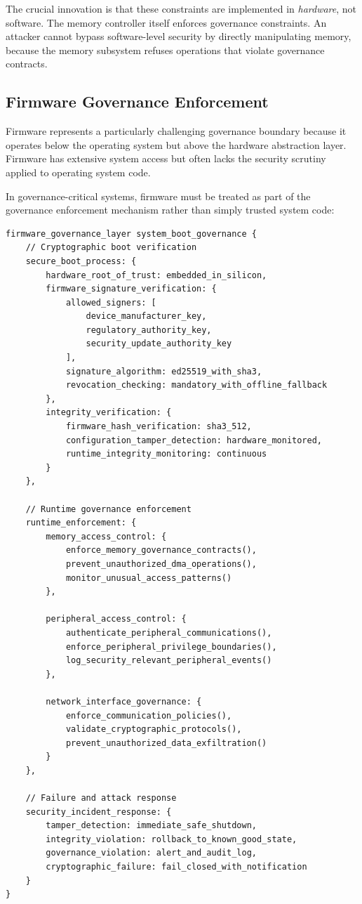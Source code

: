 The crucial innovation is that these constraints are implemented in \textit{hardware}, not software. The memory controller itself enforces governance constraints. An attacker cannot bypass software-level security by directly manipulating memory, because the memory subsystem refuses operations that violate governance contracts.

\subsection{Firmware Governance Enforcement}

Firmware represents a particularly challenging governance boundary because it operates below the operating system but above the hardware abstraction layer. Firmware has extensive system access but often lacks the security scrutiny applied to operating system code.

In governance-critical systems, firmware must be treated as part of the governance enforcement mechanism rather than simply trusted system code:

\begin{lstlisting}[language=rift, caption=Governance-Enforcing Firmware Architecture]
firmware_governance_layer system_boot_governance {
    // Cryptographic boot verification
    secure_boot_process: {
        hardware_root_of_trust: embedded_in_silicon,
        firmware_signature_verification: {
            allowed_signers: [
                device_manufacturer_key,
                regulatory_authority_key,
                security_update_authority_key
            ],
            signature_algorithm: ed25519_with_sha3,
            revocation_checking: mandatory_with_offline_fallback
        },
        integrity_verification: {
            firmware_hash_verification: sha3_512,
            configuration_tamper_detection: hardware_monitored,
            runtime_integrity_monitoring: continuous
        }
    },
    
    // Runtime governance enforcement
    runtime_enforcement: {
        memory_access_control: {
            enforce_memory_governance_contracts(),
            prevent_unauthorized_dma_operations(),
            monitor_unusual_access_patterns()
        },
        
        peripheral_access_control: {
            authenticate_peripheral_communications(),
            enforce_peripheral_privilege_boundaries(),
            log_security_relevant_peripheral_events()
        },
        
        network_interface_governance: {
            enforce_communication_policies(),
            validate_cryptographic_protocols(),
            prevent_unauthorized_data_exfiltration()
        }
    },
    
    // Failure and attack response
    security_incident_response: {
        tamper_detection: immediate_safe_shutdown,
        integrity_violation: rollback_to_known_good_state,
        governance_violation: alert_and_audit_log,
        cryptographic_failure: fail_closed_with_notification
    }
}
\end{lstlisting}

